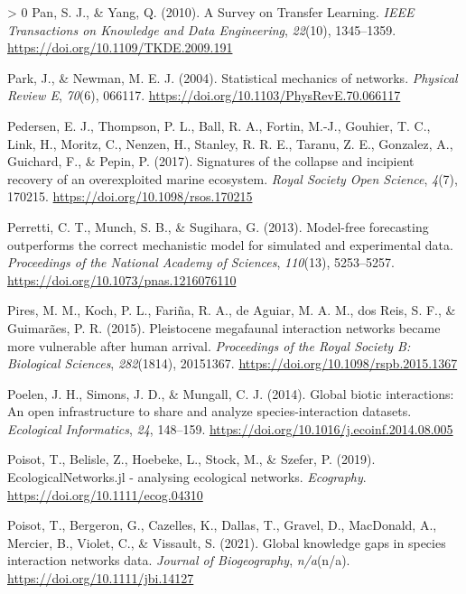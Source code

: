 \documentclass[10pt,oneside]{article}
\newlength{\cslhangindent}
\newenvironment{CSLReferences}[3] %
 {%
  \setlength{\parindent}{0pt}
  \ifodd #1 \everypar{\setlength{\hangindent}{\cslhangindent}}\ignorespaces\fi
  \ifnum #2 > 0
  \setlength{\parskip}{#2\baselineskip}
  \fi
 }%
 {}
\begin{document}
\begin{CSLReferences}{1}{0}
\leavevmode\hypertarget{ref-Pan2010SurTra}{}%
Pan, S. J., \& Yang, Q. (2010). A Survey on Transfer Learning.
\emph{IEEE Transactions on Knowledge and Data Engineering},
\emph{22}(10), 1345--1359. \url{https://doi.org/10.1109/TKDE.2009.191}

\leavevmode\hypertarget{ref-Park2004StaMec}{}%
Park, J., \& Newman, M. E. J. (2004). Statistical mechanics of networks.
\emph{Physical Review E}, \emph{70}(6), 066117.
\url{https://doi.org/10.1103/PhysRevE.70.066117}

\leavevmode\hypertarget{ref-Pedersen2017SigCol}{}%
Pedersen, E. J., Thompson, P. L., Ball, R. A., Fortin, M.-J., Gouhier,
T. C., Link, H., Moritz, C., Nenzen, H., Stanley, R. R. E., Taranu, Z.
E., Gonzalez, A., Guichard, F., \& Pepin, P. (2017). Signatures of the
collapse and incipient recovery of an overexploited marine ecosystem.
\emph{Royal Society Open Science}, \emph{4}(7), 170215.
\url{https://doi.org/10.1098/rsos.170215}

\leavevmode\hypertarget{ref-Perretti2013ModFor}{}%
Perretti, C. T., Munch, S. B., \& Sugihara, G. (2013). Model-free
forecasting outperforms the correct mechanistic model for simulated and
experimental data. \emph{Proceedings of the National Academy of
Sciences}, \emph{110}(13), 5253--5257.
\url{https://doi.org/10.1073/pnas.1216076110}

\leavevmode\hypertarget{ref-Pires2015PleMeg}{}%
Pires, M. M., Koch, P. L., Fariña, R. A., de Aguiar, M. A. M., dos Reis,
S. F., \& Guimarães, P. R. (2015). Pleistocene megafaunal interaction
networks became more vulnerable after human arrival. \emph{Proceedings
of the Royal Society B: Biological Sciences}, \emph{282}(1814),
20151367. \url{https://doi.org/10.1098/rspb.2015.1367}

\leavevmode\hypertarget{ref-Poelen2014GloBio}{}%
Poelen, J. H., Simons, J. D., \& Mungall, C. J. (2014). Global biotic
interactions: An open infrastructure to share and analyze
species-interaction datasets. \emph{Ecological Informatics}, \emph{24},
148--159. \url{https://doi.org/10.1016/j.ecoinf.2014.08.005}

\leavevmode\hypertarget{ref-Poisot2019EcoJl}{}%
Poisot, T., Belisle, Z., Hoebeke, L., Stock, M., \& Szefer, P. (2019).
EcologicalNetworks.jl - analysing ecological networks. \emph{Ecography}.
\url{https://doi.org/10.1111/ecog.04310}

\leavevmode\hypertarget{ref-Poisot2021GloKno}{}%
Poisot, T., Bergeron, G., Cazelles, K., Dallas, T., Gravel, D.,
MacDonald, A., Mercier, B., Violet, C., \& Vissault, S. (2021). Global
knowledge gaps in species interaction networks data. \emph{Journal of
Biogeography}, \emph{n/a}(n/a). \url{https://doi.org/10.1111/jbi.14127}


\end{CSLReferences}
\end{document}
